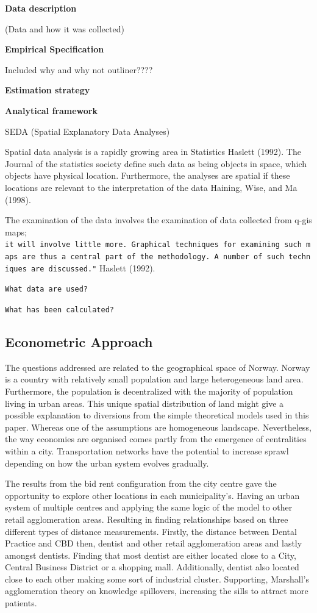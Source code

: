 \documentclass[
  10,
  a4paper,
]{article}
\begin{document}
\textbf{Data description}

(Data and how it was collected)

\textbf{Empirical Specification}

Included why and why not outliner????

\textbf{Estimation strategy}

\textbf{Analytical framework}

SEDA (Spatial Explanatory Data Analyses)

Spatial data analysis is a rapidly growing area in Statistics Haslett
(1992). The Journal of the statistics society define such data as being
objects in space, which objects have physical location. Furthermore, the
analyses are spatial if these locations are relevant to the
interpretation of the data Haining, Wise, and Ma (1998).

The examination of the data involves the examination of data collected
from q-gis maps;
\texttt{it\ will\ involve\ little\ more.\ Graphical\ techniques\ for\ examining\ such\ maps\ are\ thus\ a\ central\ part\ of\ the\ methodology.\ A\ number\ of\ such\ techniques\ are\ discussed."}
Haslett (1992).

\texttt{What\ data\ are\ used?}

\texttt{What\ has\ been\ calculated?}

\hypertarget{econometric-approach}{%
\subsection{\texorpdfstring{\textbf{Econometric
Approach}}{Econometric Approach}}\label{econometric-approach}}

The questions addressed are related to the geographical space of Norway.
Norway is a country with relatively small population and large
heterogeneous land area. Furthermore, the population is decentralized
with the majority of population living in urban areas. This unique
spatial distribution of land might give a possible explanation to
diversions from the simple theoretical models used in this paper.
Whereas one of the assumptions are homogeneous landscape. Nevertheless,
the way economies are organised comes partly from the emergence of
centralities within a city. Transportation networks have the potential
to increase sprawl depending on how the urban system evolves gradually.

The results from the bid rent configuration from the city centre gave
the opportunity to explore other locations in each municipality's.
Having an urban system of multiple centres and applying the same logic
of the model to other retail agglomeration areas. Resulting in finding
relationships based on three different types of distance measurements.
Firstly, the distance between Dental Practice and CBD then, dentist and
other retail agglomeration areas and lastly amongst dentists. Finding
that most dentist are either located close to a City, Central Business
District or a shopping mall. Additionally, dentist also located close to
each other making some sort of industrial cluster. Supporting,
Marshall's agglomeration theory on knowledge spillovers, increasing the
sills to attract more patients.
\end{document}
